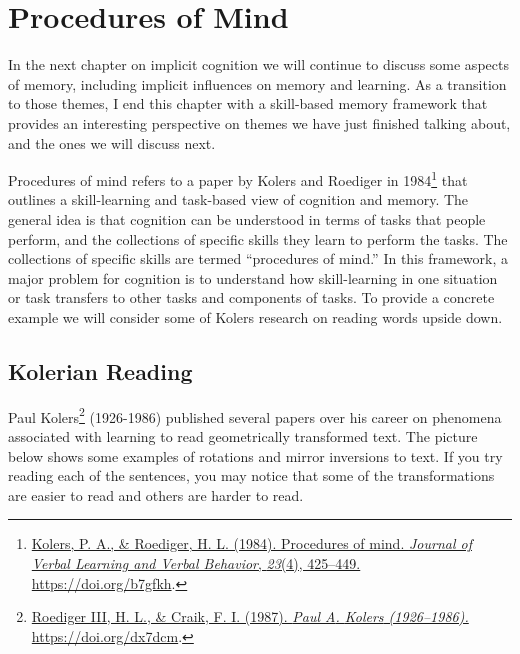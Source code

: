 \documentclass[
  oneside,
  12pt]{crumpbook}
\begin{document}
\hypertarget{procedures-of-mind}{%
\section{Procedures of Mind}\label{procedures-of-mind}}

In the next chapter on implicit cognition we will continue to discuss some aspects of memory, including implicit influences on memory and learning. As a transition to those themes, I end this chapter with a skill-based memory framework that provides an interesting perspective on themes we have just finished talking about, and the ones we will discuss next.

Procedures of mind refers to a paper by Kolers and Roediger in 1984\footnote{\protect\hyperlink{ref-kolersProceduresMind1984}{Kolers, P. A., \& Roediger, H. L. (1984). Procedures of mind. \emph{Journal of Verbal Learning and Verbal Behavior}, \emph{23}(4), 425--449. \url{https://doi.org/b7gfkh}}.} that outlines a skill-learning and task-based view of cognition and memory. The general idea is that cognition can be understood in terms of tasks that people perform, and the collections of specific skills they learn to perform the tasks. The collections of specific skills are termed ``procedures of mind.'' In this framework, a major problem for cognition is to understand how skill-learning in one situation or task transfers to other tasks and components of tasks. To provide a concrete example we will consider some of Kolers research on reading words upside down.

\hypertarget{kolerian-reading}{%
\subsection{Kolerian Reading}\label{kolerian-reading}}

Paul Kolers\footnote{\protect\hyperlink{ref-roedigeriiiPaulKolers19261987}{Roediger III, H. L., \& Craik, F. I. (1987). \emph{Paul {A}. {Kolers} (1926--1986).} \url{https://doi.org/dx7dcm}}.} (1926-1986) published several papers over his career on phenomena associated with learning to read geometrically transformed text. The picture below shows some examples of rotations and mirror inversions to text. If you try reading each of the sentences, you may notice that some of the transformations are easier to read and others are harder to read.
\end{document}

